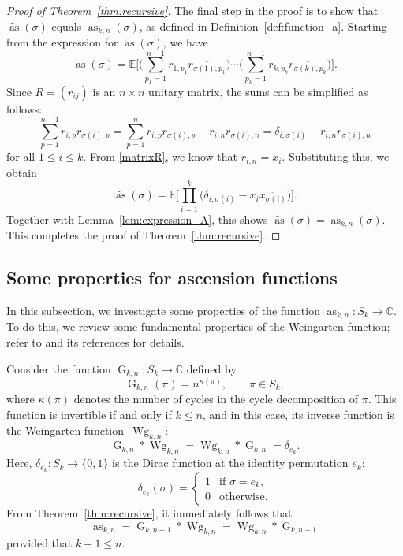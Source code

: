 \documentclass[pdftex]{sigma}
\numberwithin{equation}{section}
\theoremstyle{definition}
\DeclareMathOperator{\Raise}{as}
\DeclareMathOperator{\G}{G}
\DeclareMathOperator{\Wg}{Wg}
\begin{document}
\begin{proof}[Proof of Theorem~\ref{thm:recursive}]
The final step in the proof is to show that $\widetilde{\Raise}(\sigma)$ equals $\Raise_{k,n}(\sigma)$, as defined in Definition~\ref{def:function_a}.
Starting from the expression for $\widetilde{\Raise}(\sigma)$, we have
\[
\widetilde{\Raise}(\sigma)
= \mathbb{E} \Biggl[
\Biggl(\sum_{p_1=1}^{n-1} r_{1,p_1}\overline{r_{\sigma(1),p_1}} \Biggr)
\cdots
\Biggl(\sum_{p_k=1}^{n-1} r_{k,p_k}\overline{r_{\sigma(k),p_k}} \Biggr)
\Biggr].
\]
Since $R=(r_{ij})$ is an $n \times n$ unitary matrix,
the sums can be simplified as follows:
\[
\sum_{p=1}^{n-1} r_{i,p}\overline{r_{\sigma(i),p}} =
\sum_{p=1}^{n} r_{i,p}\overline{r_{\sigma(i),p}} -r_{i,n} \overline{r_{\sigma(i),n}}
= \delta_{i,\sigma(i)}-r_{i,n} \overline{r_{\sigma(i),n}}
\]
for all $1 \le i \le k$.
From \eqref{matrixR}, we know that $r_{i,n}=x_i$.
Substituting this, we obtain
\[
\widetilde{\Raise}(\sigma)= \mathbb{E} \Biggl[ \prod_{i=1}^k \big(\delta_{i,\sigma(i)}-x_{i} \overline{x_{\sigma(i)}}\big) \Biggr].
\]
Together with Lemma~\ref{lem:expression_A}, this shows $\widetilde{\Raise}(\sigma)=\Raise_{k,n}(\sigma)$.
This completes the proof of Theorem~\ref{thm:recursive}.
\end{proof}

\subsection{Some properties for ascension functions}

In this subsection, we investigate some properties of the function $\Raise_{k,n}\colon S_k \to \mathbb{C}$.
To do this, we review some fundamental properties of the Weingarten function;
refer to \cite{CMN} and its references for details.

Consider the function $\G_{k,n}\colon S_k \to \mathbb{C}$ defined by
\[
\G_{k,n}(\pi)= n^{\kappa(\pi)}, \qquad \pi \in S_k,
\]
where $\kappa(\pi)$ denotes the number of cycles in the cycle decomposition of $\pi$.
This function is invertible if and only if $k \le n$, and in this case,
its inverse function is the Weingarten function~$\Wg_{k,n}$:
\[
\G_{k,n} * \Wg_{k,n} = \Wg_{k,n} *\G_{k,n} =\delta_{e_k}.
\]
Here, $\delta_{e_k}\colon S_k \to \{0,1\}$ is the Dirac function at the identity permutation $e_k$:
\[
\delta_{e_k}( \sigma)= \begin{cases}
1 & \text{if $\sigma=e_k$}, \\
0 & \text{otherwise}.
\end{cases}
\]
From Theorem~\ref{thm:recursive}, it immediately follows that
\begin{equation} \label{eq:as_g_Wg}
 \Raise_{k,n} = \G_{k,n-1} * \Wg_{k,n} = \Wg_{k,n} * \G_{k,n-1}
\end{equation}
provided that $k +1 \le n$.
\end{document}
